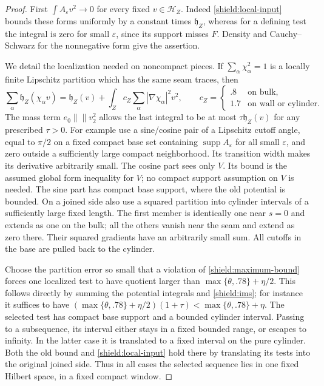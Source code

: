 \documentclass[11pt]{article}
\numberwithin{equation}{section}
\theoremstyle{definition}
\theoremstyle{remark}
\begin{document}
\begin{proof}
First $\int A_\varepsilon v^2\to0$ for every fixed $v\in\mathcal H_Z$.
Indeed \cref{shield:local-input} bounds these forms uniformly by a
constant times $\mathfrak h_Z$, whereas for a defining test the integral
is zero for small $\varepsilon$, since its support misses $F$.  Density and
Cauchy--Schwarz for the nonnegative form give the assertion.

We detail the localization needed on noncompact pieces.  If
$\sum_\alpha\chi_\alpha^2=1$ is a locally finite Lipschitz partition
which has the same seam traces, then
\begin{equation}\label{shield:ims}
 \sum_\alpha\mathfrak h_Z(\chi_\alpha v)
 =\mathfrak h_Z(v)+
   \int_Z c_Z\sum_\alpha\left\lvert{\nabla\chi_\alpha}\right\rvert^2v^2,
 \qquad
 c_Z=\begin{cases}.8&\text{on bulk},\\1.7&\text{on wall or cylinder}.
 \end{cases}
\end{equation}
The mass term $e_0\left\lVert{}\right\rVert v_2^2$ allows the last integral to be at most
$\tau\mathfrak h_Z(v)$ for any prescribed $\tau>0$.  For example use a
sine/cosine pair of a Lipschitz cutoff angle, equal to $\pi/2$ on a
fixed compact base set containing $\operatorname{supp} A_\varepsilon$ for all small $\varepsilon$,
and zero outside a sufficiently large compact neighborhood.  Its transition width makes its derivative
arbitrarily small.  The cosine part sees only $V$. Its bound is the assumed global
form inequality for $V$; no compact support assumption on $V$ is needed.
The sine part has compact base support, where the old potential is bounded.
On a joined side
also use a squared partition into cylinder intervals of a sufficiently
large fixed length.  The first member is identically one near $s=0$
and extends as one on the bulk; all the others vanish near the seam
and extend as zero there.  Their squared gradients have an arbitrarily
small sum.  All cutoffs in the base are pulled back to the cylinder.

Choose the partition error so small that a violation of
\cref{shield:maximum-bound} forces one localized test to have quotient
larger than $\max\{\theta,.78\}+\eta/2$.  This follows directly by
summing the potential integrals and \cref{shield:ims}; for instance it
suffices to have
$(\max\{\theta,.78\}+\eta/2)(1+\tau)
 <\max\{\theta,.78\}+\eta$.
The selected test has compact base support and a bounded cylinder
interval.  Passing to a subsequence, its interval either stays in a
fixed bounded range, or escapes to infinity.  In the latter case it is
translated to a fixed interval on the pure cylinder.  Both the old
bound and \cref{shield:local-input} hold there by translating its tests
into the original joined side.  Thus in all cases the selected sequence
lies in one fixed Hilbert space, in a fixed compact window.


\end{proof}
\end{document}
